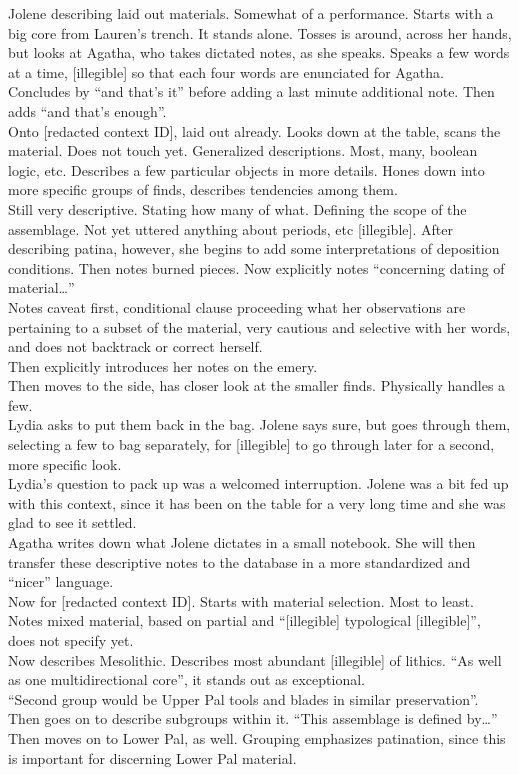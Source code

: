 \documentclass[
  canadian,
]{article}
\begin{document}
Jolene describing laid out materials. Somewhat of a performance. Starts
with a big core from Lauren's trench. It stands alone. Tosses is around,
across her hands, but looks at Agatha, who takes dictated notes, as she
speaks. Speaks a few words at a time, {[}illegible{]} so that each four
words are enunciated for Agatha.\\
Concludes by ``and that's it'' before adding a last minute additional
note. Then adds ``and that's enough''.\\
Onto {[}redacted context ID{]}, laid out already. Looks down at the
table, scans the material. Does not touch yet. Generalized descriptions.
Most, many, boolean logic, etc. Describes a few particular objects in
more details. Hones down into more specific groups of finds, describes
tendencies among them.\\
Still very descriptive. Stating how many of what. Defining the scope of
the assemblage. Not yet uttered anything about periods, etc
{[}illegible{]}. After describing patina, however, she begins to add
some interpretations of deposition conditions. Then notes burned pieces.
Now explicitly notes ``concerning dating of material\ldots{}''\\
Notes caveat first, conditional clause proceeding what her observations
are pertaining to a subset of the material, very cautious and selective
with her words, and does not backtrack or correct herself.\\
Then explicitly introduces her notes on the emery.\\
Then moves to the side, has closer look at the smaller finds. Physically
handles a few.\\
Lydia asks to put them back in the bag. Jolene says sure, but goes
through them, selecting a few to bag separately, for {[}illegible{]} to
go through later for a second, more specific look.\\
Lydia's question to pack up was a welcomed interruption. Jolene was a
bit fed up with this context, since it has been on the table for a very
long time and she was glad to see it settled.\\
Agatha writes down what Jolene dictates in a small notebook. She will
then transfer these descriptive notes to the database in a more
standardized and ``nicer'' language.\\
Now for {[}redacted context ID{]}. Starts with material selection. Most
to least. Notes mixed material, based on partial and ``{[}illegible{]}
typological {[}illegible{]}'', does not specify yet.\\
Now describes Mesolithic. Describes most abundant {[}illegible{]} of
lithics. ``As well as one multidirectional core'', it stands out as
exceptional.\\
``Second group would be Upper Pal tools and blades in similar
preservation''. Then goes on to describe subgroups within it. ``This
assemblage is defined by\ldots{}''\\
Then moves on to Lower Pal, as well. Grouping emphasizes patination,
since this is important for discerning Lower Pal material.
\end{document}
